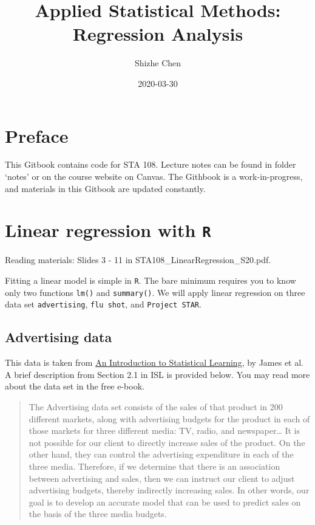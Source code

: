 \documentclass[12pt,]{book}
\title{Applied Statistical Methods: Regression Analysis}
\author{Shizhe Chen}
\date{2020-03-30}
\begin{document}
\maketitle

{
\setcounter{tocdepth}{1}
\tableofcontents
}
\chapter*{Preface}\label{pre}

This Gitbook contains code for STA 108. Lecture notes can be found in
folder `notes' or on the course website on Canvas. The Githbook is a
work-in-progress, and materials in this Gitbook are updated constantly.

\chapter{\texorpdfstring{Linear regression with
\texttt{R}}{Linear regression with R}}\label{ch:lmR}

Reading materials: Slides 3 - 11 in STA108\_LinearRegression\_S20.pdf.

Fitting a linear model is simple in \texttt{R}. The bare minimum
requires you to know only two functions \texttt{lm()} and
\texttt{summary()}. We will apply linear regression on three data set
\texttt{advertising}, \texttt{flu\ shot}, and \texttt{Project\ STAR}.

\section{Advertising data}\label{advertising-data}

This data is taken from
\href{http://faculty.marshall.usc.edu/gareth-james/ISL/}{An Introduction
to Statistical Learning}, by James et al. A brief description from
Section 2.1 in ISL is provided below. You may read more about the data
set in the free e-book.

\begin{quote}
The Advertising data set consists of the sales of that product in 200
different markets, along with advertising budgets for the product in
each of those markets for three different media: TV, radio, and
newspaper\ldots{} It is not possible for our client to directly increase
sales of the product. On the other hand, they can control the
advertising expenditure in each of the three media. Therefore, if we
determine that there is an association between advertising and sales,
then we can instruct our client to adjust advertising budgets, thereby
indirectly increasing sales. In other words, our goal is to develop an
accurate model that can be used to predict sales on the basis of the
three media budgets.
\end{quote}
\end{document}

